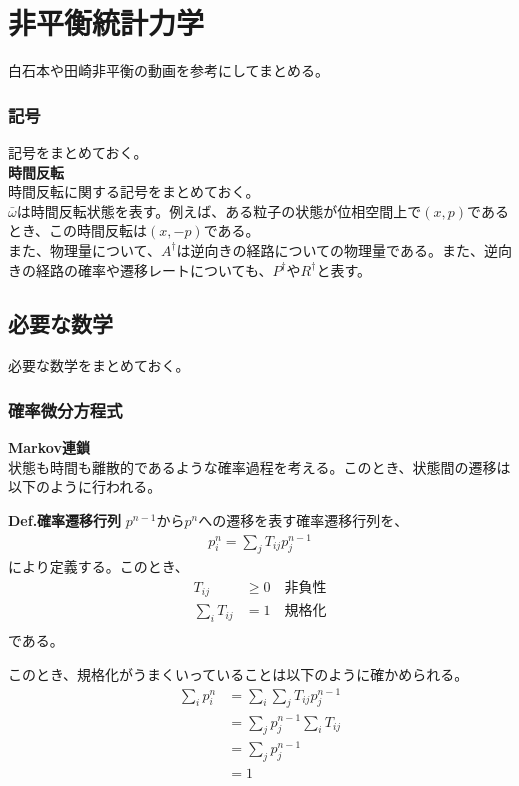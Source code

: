 \documentclass[a4paper,11pt]{jsarticle}
\numberwithin{equation}{section}
\begin{document}
\newpage

\section{非平衡統計力学}
白石本や田崎非平衡の動画を参考にしてまとめる。\\
\subsubsection{記号}
記号をまとめておく。\\

\textbf{時間反転}\\
時間反転に関する記号をまとめておく。\\
$\bar{\omega}$は時間反転状態を表す。例えば、ある粒子の状態が位相空間上で$(x,p)$であるとき、この時間反転は$(x,-p)$である。\\
また、物理量について、$A^{\dagger}$は逆向きの経路についての物理量である。また、逆向きの経路の確率や遷移レートについても、$P^{\dagger}$や$R^{\dagger}$と表す。\\
\subsection{必要な数学}
必要な数学をまとめておく。\\


\subsubsection{確率微分方程式}
\textbf{Markov連鎖}\\
状態も時間も離散的であるような確率過程を考える。このとき、状態間の遷移は以下のように行われる。
\begin{itembox}[l]{\textbf{Def.確率遷移行列}}
  $p^{n-1}$から$p^{n}$への遷移を表す確率遷移行列を、
  \begin{align}
    p^{n}_i = \sum_{j}T_{ij}p^{n-1}_j
  \end{align}
  により定義する。このとき、
  \begin{align}
    T_{ij} &\geq 0 \quad \text{非負性}\\
    \sum_{i}T_{ij} &= 1 \quad \text{規格化}\\
  \end{align}
  である。
\end{itembox}
このとき、規格化がうまくいっていることは以下のように確かめられる。\\
\begin{align}
  \sum_{i}p^{n}_i &= \sum_{i}\sum_{j}T_{ij}p^{n-1}_j\\
  &= \sum_{j}p^{n-1}_j\sum_{i}T_{ij}\\
  &= \sum_{j}p^{n-1}_j\\
  &= 1
\end{align}
\end{document}
